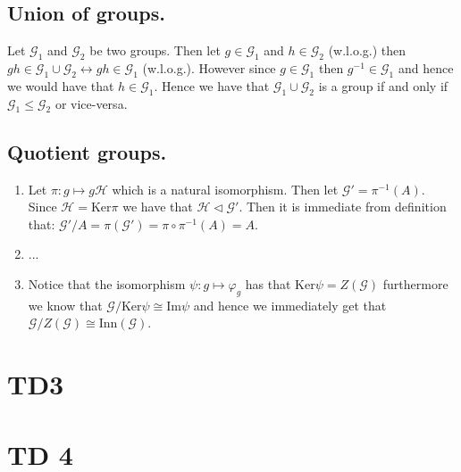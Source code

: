 \documentclass[10pt,a4paper]{book}
\begin{document}
\section{Union of groups.}
Let $\mathcal{G}_1$ and $\mathcal{G}_2$ be two groups. Then let $g \in \mathcal{G}_1$ and $h \in \mathcal{G}_2$ (w.l.o.g.) then $gh \in \mathcal{G}_1 \cup \mathcal{G}_2 \leftrightarrow gh \in \mathcal{G}_1$ (w.l.o.g.). However since $g \in \mathcal{G}_1$ then $g^{-1} \in \mathcal{G}_1$ and hence we would have that $h \in \mathcal{G}_1$. Hence we have that $\mathcal{G}_1 \cup \mathcal{G}_2$ is a group if and only if $\mathcal{G}_1 \leqslant \mathcal{G}_2$ or vice-versa.   

\section{Quotient groups.}
\begin{enumerate}
\item Let $\pi : g \mapsto g \mathcal{H}$ which is a natural isomorphism. Then let $\mathcal{G}' = \pi^{-1}(A)$. Since $\mathcal{H} = \text{Ker}\pi$ we have that $\mathcal{H} \triangleleft \mathcal{G}'$. Then it is immediate from definition that: $\mathcal{G}'/A = \pi(\mathcal{G}') = \pi \circ \pi^{-1} (A) = A$. 
\item ...
\item Notice that the isomorphism $\psi : g \mapsto \varphi_g$ has that $\text{Ker} \psi = Z( \mathcal{G})$ furthermore we know that $\mathcal{G}/\text{Ker} \psi \cong \text{Im} \psi$ and hence we immediately get that $\mathcal{G}/Z(\mathcal{G}) \cong \text{Inn}(\mathcal{G})$. 
\end{enumerate}

\chapter{TD3}

\chapter{TD 4}
\end{document}
